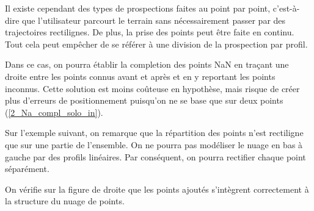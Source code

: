 \documentclass[12pt]{article}
\begin{document}
\newpage\newpage
    Il existe cependant des types de prospections faites au point par point, c'est-à-dire que l'utilisateur parcourt le terrain sans nécessairement passer par des trajectoires rectilignes. De plus, la prise des points peut être faite en continu. Tout cela peut empêcher de se référer à une division de la prospection par profil.

    \label{2_Na_compl_solo_out} Dans ce cas, on pourra établir la completion des points NaN en traçant une droite entre les points connus avant et après et en y reportant les points inconnus. Cette solution est moins coûteuse en hypothèse, mais risque de créer plus d'erreurs de positionnement puisqu'on ne se base que sur deux points (\ref{2_Na_compl_solo_in}).

    Sur l'exemple suivant, on remarque que la répartition des points n'est rectiligne que sur une partie de l'ensemble. On ne pourra pas modéliser le nuage en bas à gauche par des profils linéaires. Par conséquent, on pourra rectifier chaque point séparément.

    On vérifie sur la figure de droite que les points ajoutés s'intègrent correctement à la structure du nuage de points.
\end{document}
